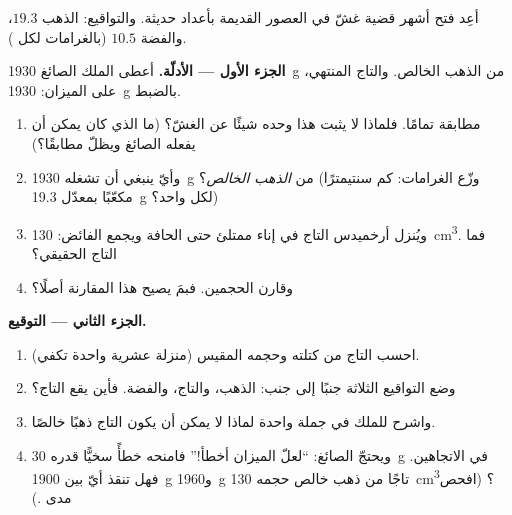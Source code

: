 \begin{problem}\label{pb:g6:density-floating:1}
أعِد فتح أشهر قضية غشّ في العصور القديمة بأعداد حديثة.
والتواقيع: الذهب $19.3$، والفضة $10.5$ (بالغرامات لكل ).

\medskip\noindent\textbf{الجزء الأول --- الأدلّة.}
أعطى الملك الصائغ \qty{1930}{g} من الذهب الخالص. والتاج المنتهي،
على الميزان: \qty{1930}{g} بالضبط.
\begin{enumerate}
  \item {} مطابقة تمامًا. فلماذا لا يثبت هذا وحده شيئًا عن
        الغشّ؟ (ما الذي كان يمكن أن يفعله الصائغ ويظلّ
        مطابقًا؟)
  \item وأيّ  ينبغي أن تشغله \qty{1930}{g} من \emph{الذهب
        الخالص}؟ (وزّع الغرامات: كم سنتيمترًا مكعّبًا بمعدّل
        \qty{19.3}{g} لكل واحد؟)
  \item ويُنزل أرخميدس التاج في إناء ممتلئ حتى الحافة ويجمع
        الفائض: \qty{130}{cm^3}. فما  التاج الحقيقي؟
  \item وقارن الحجمين. فبمَ يصيح هذا المقارنة أصلًا؟
\end{enumerate}

\medskip\noindent\textbf{الجزء الثاني --- التوقيع.}
\begin{enumerate}[resume]
  \item احسب  التاج من كتلته وحجمه المقيس (منزلة عشرية
        واحدة تكفي).
  \item وضع التواقيع الثلاثة جنبًا إلى جنب: الذهب، والتاج،
        والفضة. فأين يقع التاج؟
  \item واشرح للملك في جملة واحدة لماذا لا يمكن أن يكون التاج
        ذهبًا خالصًا.
  \item ويحتجّ الصائغ: ``لعلّ الميزان أخطأ!'' فامنحه خطأً
        سخيًّا قدره \qty{30}{g} في الاتجاهين. فهل تنقذ أيّ 
        بين \qty{1900}{g} و\qty{1960}{g} تاجًا من ذهب خالص حجمه
        \qty{130}{cm^3}؟ (افحص مدى .)
\end{enumerate}


\end{problem}
